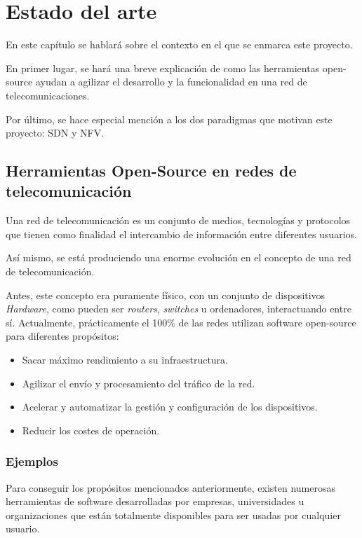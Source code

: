 \chapter{Estado del arte}
En este capítulo se hablará sobre el contexto en el que se enmarca este proyecto.

En primer lugar, se hará una breve explicación de como las herramientas open-source ayudan a agilizar el desarrollo y la funcionalidad en una red de telecomunicaciones.

Por último, se hace especial mención a los dos paradigmas que motivan este proyecto: SDN y NFV.

\section{Herramientas Open-Source en redes de telecomunicación}

Una red de telecomunicación es un conjunto de medios, tecnologías y protocolos que tienen como finalidad el intercambio de información entre diferentes usuarios.

Así mismo, se está produciendo una enorme evolución en el concepto de una red de telecomunicación. 

Antes, este concepto era puramente físico, con un conjunto de dispositivos \textit{Hardware}, como pueden ser \textit{routers}, \textit{switches} u ordenadores, interactuando entre sí. Actualmente, prácticamente el 100\% de las redes utilizan software open-source para diferentes propósitos:

\begin{itemize}
	\item Sacar máximo rendimiento a su infraestructura.
	\item Agilizar el envío y procesamiento del tráfico de la red.
	\item Acelerar y automatizar la gestión y configuración de los dispositivos.
	\item Reducir los costes de operación.
\end{itemize}

\subsection{Ejemplos}

Para conseguir los propósitos mencionados anteriormente, existen numerosas herramientas de software desarrolladas por empresas, universidades u organizaciones que están totalmente disponibles para ser usadas por cualquier usuario.

